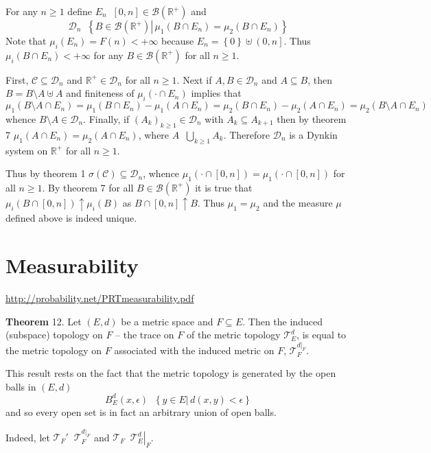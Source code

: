 \documentclass[a4paper]{article}
\newcommand{\obj}[1]{\left\{ #1 \right \}}
\newcommand{\clo}[1]{\left [ #1 \right ]}
\newcommand{\ploc}[1]{\left ( #1 \right ]}
\newcommand{\brac}[1]{\left ( #1 \right )}
\newcommand{\induc}[1]{\left . #1 \right \vert}
\newcommand{\Real}{\mathbb{R}}
\newcommand{\Tcal}{\mathcal{T}}
\newcommand{\Dcal}{\mathcal{D}}
\newcommand{\Ccal}{\mathcal{C}}
\newcommand{\borel}[1]{\mathcal{B}\brac{#1}}
\newcommand{\defn}{\mathop{\overset{\Delta}{=}}\nolimits}
\begin{document}
For any $n\geq 1$ define $E_n\defn \clo{0,n}\in\borel{\Real^+}$ and \[\Dcal_n\defn \obj{ \induc{B\in\borel{\Real^+}}\, \mu_1\brac{B\cap E_n}=\mu_2\brac{B\cap E_n} }\] Note that $\mu_i\brac{E_n}=F\brac{n}<+\infty$ because $E_n = \obj{0}\uplus\ploc{0,n}$. Thus $\mu_i\brac{B\cap E_n}<+\infty$ for any $B\in \borel{\Real^+}$ for all $n\geq1$.

First, $\Ccal\subseteq \Dcal_n$ and $\Real^+\in \Dcal_n$ for all $n\geq1$. Next if $A,B\in \Dcal_n$ and $A\subseteq B$, then $B=B\setminus A \uplus A$ and finiteness of $\mu_i\brac{\cdot\cap E_n}$ implies that \[\mu_1\brac{B\setminus A\cap E_n}=\mu_1\brac{B\cap E_n}-\mu_1\brac{A\cap E_n}=\mu_2\brac{B\cap E_n}-\mu_2\brac{A\cap E_n}=\mu_2\brac{B\setminus A\cap E_n}\] whence $B\setminus A\in \Dcal_n$. Finally, if $\brac{A_k}_{k\geq1}\in \Dcal_n$ with $A_k\subseteq A_{k+1}$ then by theorem 7 $\mu_1\brac{A\cap E_n}=\mu_2\brac{A\cap E_n}$, where $A\defn \bigcup_{k\geq1} A_k$. Therefore $\Dcal_n$ is a Dynkin system on $\Real^+$ for all $n\geq1$.

Thus by theorem 1 $\sigma\brac{\Ccal}\subseteq\Dcal_n$, whence $\mu_1\brac{\cdot\cap \clo{0,n}}=\mu_1\brac{\cdot\cap \clo{0,n}}$ for all $n\geq1$. By theorem 7 for all $B\in \borel{\Real^+}$ it is true that $\mu_i\brac{B\cap\clo{0,n}}\uparrow \mu_i\brac{B}$ as $B\cap\clo{0,n}\uparrow B$. Thus $\mu_1=\mu_2$ and the measure $\mu$ defined above is indeed unique.\\


\section{Measurability} %
\label{sec:tut_4}
\url{http://probability.net/PRTmeasurability.pdf}

\label{thm:metric_trace} \noindent \textbf{Theorem} 12.
Let $\brac{E,d}$ be a metric space and $F\subseteq E$. Then the induced (subspace) topology on $F$ -- the trace on $F$ of the metric topology $\Tcal_E^d$, is equal to the metric topology on $F$ associated with the induced metric on $F$, $\Tcal_F^{\induc{d}_F}$.

This result rests on the fact that the metric topology is generated by the open balls in $\brac{E,d}$ \[B^d_E\brac{x,\epsilon}\defn\obj{ \induc{y\in E}\, d\brac{x,y}<\epsilon }\] and so every open set is in fact an arbitrary union of open balls.

Indeed, let $\Tcal_F'\defn\Tcal_F^{\induc{d}_F}$ and $\Tcal_F\defn\induc{\Tcal_E^d}_F$.
\end{document}
